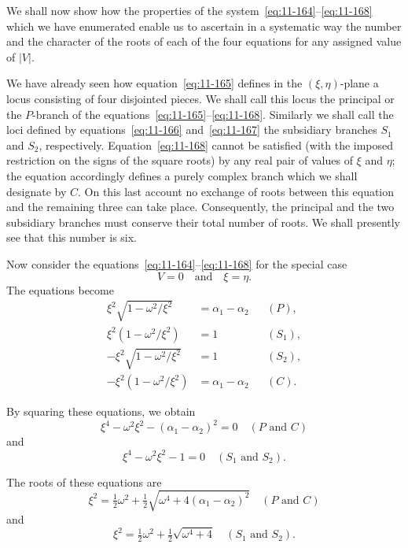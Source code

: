 We shall now show how the properties of the system~\eqref{eq:11-164}--\eqref{eq:11-168} which we have enumerated enable us to ascertain in a systematic way the number and the character of the roots of each of the four equations for any assigned value of $|V|$.

We have already seen how equation~\eqref{eq:11-165} defines in the $(\xi,\eta)$-plane a locus consisting of four disjointed pieces. We shall call this locus the principal or the $P$-branch of the equations~\eqref{eq:11-165}--\eqref{eq:11-168}. Similarly we shall call the loci defined by equations~\eqref{eq:11-166} and~\eqref{eq:11-167} the subsidiary branches $S_1$ and $S_2$, respectively. Equation~\eqref{eq:11-168} cannot be satisfied (with the imposed restriction on the signs of the square roots) by any real pair of values of $\xi$ and $\eta$; the equation accordingly defines a purely complex branch which we shall designate by $C$. On this last account no exchange of roots between this equation and the remaining three can take place. Consequently, the principal and the two subsidiary branches must conserve their total number of roots. We shall presently see that this number is six.

Now consider the equations~\eqref{eq:11-164}--\eqref{eq:11-168} for the special case
\begin{equation}
\label{eq:11-169}
V = 0 \quad\text{and}\quad \xi = \eta.
\end{equation}
The equations become
\begin{align}
\label{eq:11-170}
\xi^2\!\sqrt{1-\omega^2/\xi^2} &= \alpha_1-\alpha_2 && (P), \\
\label{eq:11-171}
\xi^2(1-\omega^2/\xi^2) &= 1 && (S_1), \\
\label{eq:11-172}
-\xi^2\!\sqrt{1-\omega^2/\xi^2} &= 1 && (S_2), \\
\label{eq:11-173}
-\xi^2(1-\omega^2/\xi^2) &= \alpha_1-\alpha_2 && (C).
\end{align}

By squaring these equations, we obtain
\begin{equation}
\label{eq:11-174}
\xi^4-\omega^2\xi^2-(\alpha_1-\alpha_2)^2 = 0 \quad (P \text{ and } C)
\end{equation}
and
\begin{equation}
\label{eq:11-175}
\xi^4-\omega^2\xi^2-1 = 0 \quad (S_1 \text{ and } S_2).
\end{equation}

The roots of these equations are
\begin{equation}
\label{eq:11-176}
\xi^2 = \tfrac{1}{2}\omega^2+\tfrac{1}{2}\sqrt{\omega^4+4(\alpha_1-\alpha_2)^2} \quad (P \text{ and } C)
\end{equation}
and
\begin{equation}
\label{eq:11-177}
\xi^2 = \tfrac{1}{2}\omega^2+\tfrac{1}{2}\sqrt{\omega^4+4} \quad (S_1 \text{ and } S_2).
\end{equation}

